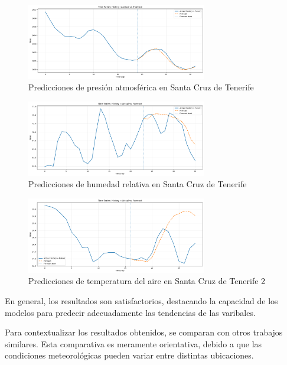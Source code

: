 \begin{figure}
    \centering
    \includegraphics[width=0.7\textwidth]{images/grafico_f12_pres.png}
    \caption{Predicciones de presión atmosférica en Santa Cruz de Tenerife}
    \label{pres_sct}
\end{figure}    

\begin{figure}
    \centering
    \includegraphics[width=0.7\textwidth]{images/grafico_f12_hum.png}
    \caption{Predicciones de humedad relativa en Santa Cruz de Tenerife}
    \label{hum_sct}
\end{figure}

\begin{figure}
    \centering
    \includegraphics[width=0.7\textwidth]{images/grafico_f12_temp_mal.png}
    \caption{Predicciones de temperatura del aire en Santa Cruz de Tenerife 2}
    \label{temp_sct_error}
\end{figure}

En general, los resultados son satisfactorios, destacando la capacidad de los modelos para predecir adecuadamente las tendencias de las varibales.

Para contextualizar los resultados obtenidos, se comparan con otros trabajos similares.
Esta comparativa es meramente orientativa, debido a que las condiciones meteorológicas pueden variar entre distintas ubicaciones.

